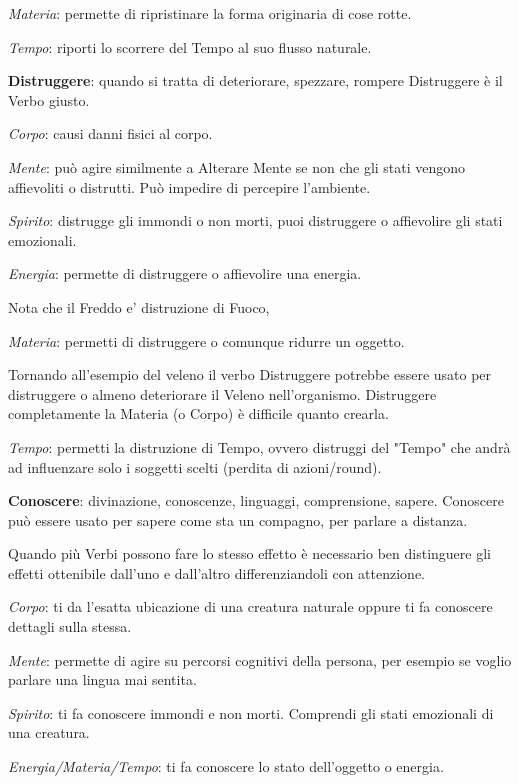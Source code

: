 \documentclass[a4paper,twoside,openany]{book}
\begin{document}
\begin{multicols}{2}
\textit{Materia}: permette di ripristinare la forma originaria di cose rotte.

\textit{Tempo}: riporti lo scorrere del Tempo al suo flusso naturale.


\textbf{Distruggere}: quando si tratta di deteriorare, spezzare, rompere Distruggere è il Verbo giusto. 

\textit{Corpo}: causi danni fisici al corpo. 

\textit{Mente}: può agire similmente a Alterare Mente se non che gli stati vengono affievoliti o distrutti. Può impedire di percepire l'ambiente.

\textit{Spirito}: distrugge gli immondi o non morti, puoi distruggere o affievolire gli stati emozionali.

\textit{Energia}: permette di distruggere o affievolire una energia.

Nota che il Freddo e' distruzione di Fuoco, 

\textit{Materia}: permetti di distruggere o comunque ridurre un oggetto.

Tornando all'esempio del veleno il verbo Distruggere potrebbe essere usato per distruggere o almeno deteriorare il Veleno nell'organismo. Distruggere completamente la Materia (o Corpo) è difficile quanto crearla.

\textit{Tempo}: permetti la distruzione di Tempo, ovvero distruggi del "Tempo" che andrà ad influenzare solo i soggetti scelti (perdita di azioni/round).

\textbf{Conoscere}: divinazione, conoscenze, linguaggi, comprensione, sapere. Conoscere può essere usato per sapere come sta un compagno, per parlare a distanza.

Quando più Verbi possono fare lo stesso effetto è necessario ben distinguere gli effetti ottenibile dall'uno e dall'altro differenziandoli con attenzione.

\textit{Corpo}: ti da l'esatta ubicazione di una creatura naturale oppure ti fa conoscere dettagli sulla stessa.

\textit{Mente}: permette di agire su percorsi cognitivi della persona, per esempio se voglio parlare una lingua mai sentita.

\textit{Spirito}: ti fa conoscere immondi e non morti. Comprendi gli stati emozionali di una creatura.

\textit{Energia/Materia/Tempo}: ti fa conoscere lo stato dell'oggetto o energia.


\end{multicols}
\end{document}
